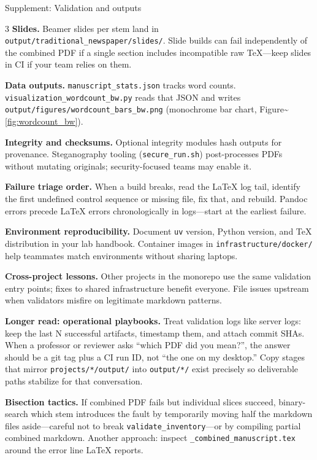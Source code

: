 \documentclass[
  ignorenonframetext,
]{beamer}
\begin{document}
\begin{frame}[fragile]{Supplement: Validation and outputs}
\begin{multicols}{3}
\textbf{Slides.} Beamer slides per stem land in
\texttt{output/traditional\_newspaper/slides/}. Slide builds can fail
independently of the combined PDF if a single section includes
incompatible raw TeX---keep slides in CI if your team relies on them.

\textbf{Data outputs.} \texttt{manuscript\_stats.json} tracks word
counts. \texttt{visualization\_wordcount\_bw.py} reads that JSON and
writes \texttt{output/figures/wordcount\_bars\_bw.png} (monochrome bar
chart, Figure\textasciitilde{}\ref{fig:wordcount_bw}).

\textbf{Integrity and checksums.} Optional integrity modules hash
outputs for provenance. Steganography tooling (\texttt{secure\_run.sh})
post-processes PDFs without mutating originals; security-focused teams
may enable it.

\textbf{Failure triage order.} When a build breaks, read the LaTeX log
tail, identify the first undefined control sequence or missing file, fix
that, and rebuild. Pandoc errors precede LaTeX errors chronologically in
logs---start at the earliest failure.

\textbf{Environment reproducibility.} Document \texttt{uv} version,
Python version, and TeX distribution in your lab handbook. Container
images in \texttt{infrastructure/docker/} help teammates match
environments without sharing laptops.

\textbf{Cross-project lessons.} Other projects in the monorepo use the
same validation entry points; fixes to shared infrastructure benefit
everyone. File issues upstream when validators misfire on legitimate
markdown patterns.

\textbf{Longer read: operational playbooks.} Treat validation logs like
server logs: keep the last N successful artifacts, timestamp them, and
attach commit SHAs. When a professor or reviewer asks ``which PDF did
you mean?'', the answer should be a git tag plus a CI run ID, not ``the
one on my desktop.'' Copy stages that mirror \texttt{projects/*/output/}
into \texttt{output/*/} exist precisely so deliverable paths stabilize
for that conversation.

\textbf{Bisection tactics.} If combined PDF fails but individual slices
succeed, binary-search which stem introduces the fault by temporarily
moving half the markdown files aside---careful not to break
\texttt{validate\_inventory}---or by compiling partial combined
markdown. Another approach: inspect \texttt{\_combined\_manuscript.tex}
around the error line LaTeX reports.


\end{multicols}
\end{frame}
\end{document}
